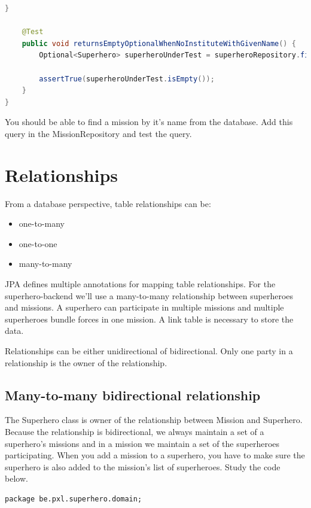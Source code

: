 \begin{itemize}
\begin{lstlisting}[frame=single, language=java]
	}

	@Test
	public void returnsEmptyOptionalWhenNoInstituteWithGivenName() {
		Optional<Superhero> superheroUnderTest = superheroRepository.findSuperheroBySuperheroName("Robin Hood");

		assertTrue(superheroUnderTest.isEmpty());
	}
}
\end{lstlisting}

\begin{oefening}
You should be able to find a mission by it's name from the database. Add this query in the MissionRepository and test the query.
\end{oefening}


\section{Relationships}

From a database perspective, table relationships can be:
\begin{itemize}
\item one-to-many
\item one-to-one
\item many-to-many
\end{itemize}

JPA defines multiple annotations for mapping table relationships. For the superhero-backend we'll use a many-to-many relationship between superheroes and missions. A superhero can participate in multiple missions and multiple superheroes bundle forces in one mission. A link table is necessary to store the data.

Relationships can be either unidirectional of bidirectional. Only one party in a relationship is the owner of the relationship. 
 

\subsection{Many-to-many bidirectional relationship}

The Superhero class is owner of the relationship between Mission and Superhero. Because the relationship is bidirectional, we always maintain a set of a superhero's missions and in a mission we maintain a set of the superheroes participating.
When you add a mission to a superhero, you have to make sure the superhero is also added to the mission's list of superheroes.
Study the code below.


\begin{lstlisting}
package be.pxl.superhero.domain;


\end{lstlisting}
\end{itemize}
